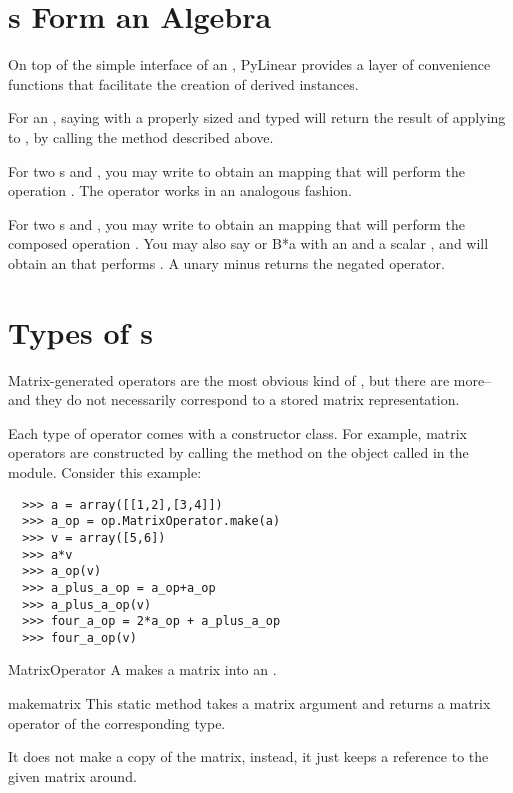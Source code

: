 \section{s Form an Algebra}

On top of the simple interface of an , PyLinear 
provides a layer of convenience functions that facilitate the
creation of derived instances.

\opindex{()}For an  , saying 
with a properly sized and typed   will
return the result of applying  to , by calling the
 method described above.

\opindex{+}For two s  and , you may write
 to obtain an  mapping that will
perform the operation . The operator \code{-} works
in an analogous fashion.

\opindex{*}For two s  and , you may
write  to obtain an  mapping that will
perform the composed operation . You may also say
 or {B*a} with an   and a scalar
, and will obtain an  that performs
. A unary minus  returns the negated
operator.

\section{Types of s}

Matrix-generated operators are the most obvious kind of , but
there are more--and they do not necessarily correspond to a stored matrix
representation.

Each type of operator comes with a constructor class. For example,
matrix operators are constructed by calling the method 
on the object called  in the  
module. Consider this example:
\begin{verbatim}
  >>> a = array([[1,2],[3,4]])
  >>> a_op = op.MatrixOperator.make(a)
  >>> v = array([5,6])
  >>> a*v
  >>> a_op(v)
  >>> a_plus_a_op = a_op+a_op
  >>> a_plus_a_op(v)
  >>> four_a_op = 2*a_op + a_plus_a_op
  >>> four_a_op(v)
\end{verbatim}

\begin{classdesc*}{MatrixOperator}
  A  makes a matrix into an .
\end{classdesc*}
\begin{methoddesc}{make}{matrix}
  This static method takes a matrix argument and returns a matrix
  operator of the corresponding type.

  It does not make a copy of the matrix, instead, it just keeps
  a reference to the given matrix around.
\end{methoddesc}


